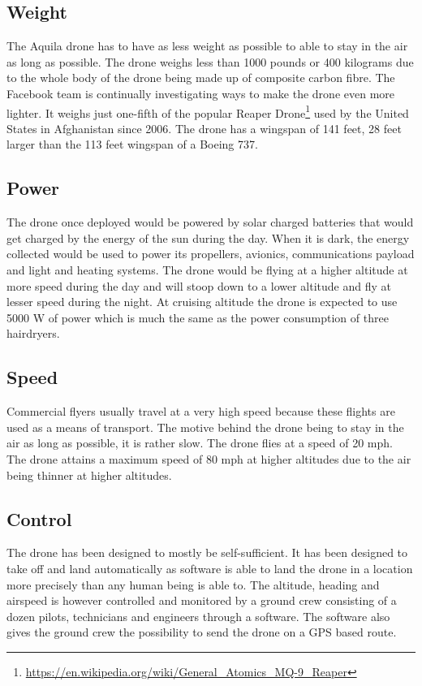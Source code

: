 \documentclass{llncs}
\begin{document}
                \subsection{Weight}
	The Aquila drone has to have as less weight as possible to able to stay in the air as long as possible. The drone weighs less than 1000 
	pounds or 400 kilograms due to the whole body of the drone being made up of composite carbon fibre. The Facebook team is continually 
	investigating ways to make the drone even more lighter. It weighs just one-fifth of the popular Reaper Drone\footnote{\url{https://en.wikipedia.org/wiki/General_Atomics_MQ-9_Reaper}} used by the United States in 
	Afghanistan since 2006. The drone has a wingspan of 141 feet, 28 feet larger than the 113 feet wingspan of a Boeing 737.
	
	
	\subsection{Power}
           The drone once deployed would be powered by solar charged batteries that would get charged by the energy of the sun during the day. When it is dark, the energy collected would be used to power its propellers, avionics, communications payload and light and heating systems. The drone would be flying at a higher altitude at more speed during the day and will stoop down to a lower altitude and fly at lesser speed during the night. At cruising altitude the drone is expected to use 5000 W of power which is much the same as the power consumption of three hairdryers. 
           
           \subsection{Speed}
           Commercial flyers usually travel at a very high speed because these flights are used as a means of transport. The motive behind the drone being to stay in the air as long as possible, it is rather slow. The drone flies at a speed of 20 mph. The drone attains a maximum speed of 80 mph at higher altitudes due to the air being thinner at higher altitudes.
           
           \subsection{Control}
           The drone has been designed to mostly be self-sufficient. It has been designed to take off and land automatically as software is able to land the drone in a location more precisely than any human being is able to. The altitude, heading and airspeed is however controlled and monitored by a ground crew consisting of a dozen pilots, technicians and engineers through a software. The software also gives the ground crew the possibility to send the drone on a GPS based route.
           
\end{document}
